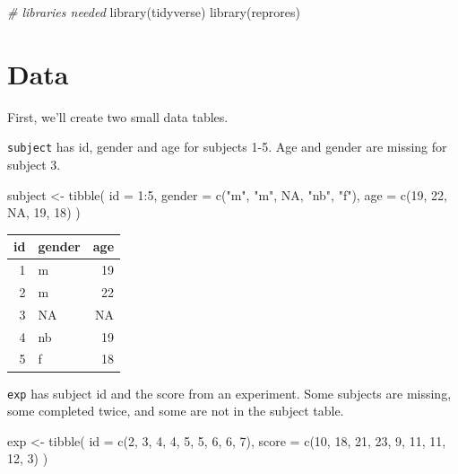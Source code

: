 \documentclass[
  oneside]{book}
\newenvironment{Shaded}{\begin{snugshade}}{\end{snugshade}}
\newcommand{\AttributeTok}[1]{\textcolor[rgb]{0.77,0.63,0.00}{#1}}
\newcommand{\CommentTok}[1]{\textcolor[rgb]{0.56,0.35,0.01}{\textit{#1}}}
\newcommand{\ConstantTok}[1]{\textcolor[rgb]{0.00,0.00,0.00}{#1}}
\newcommand{\DecValTok}[1]{\textcolor[rgb]{0.00,0.00,0.81}{#1}}
\newcommand{\FunctionTok}[1]{\textcolor[rgb]{0.00,0.00,0.00}{#1}}
\newcommand{\NormalTok}[1]{#1}
\newcommand{\OtherTok}[1]{\textcolor[rgb]{0.56,0.35,0.01}{#1}}
\newcommand{\SpecialCharTok}[1]{\textcolor[rgb]{0.00,0.00,0.00}{#1}}
\newcommand{\StringTok}[1]{\textcolor[rgb]{0.31,0.60,0.02}{#1}}
\begin{document}
\begin{Shaded}
\begin{Highlighting}[]
\CommentTok{\# libraries needed}
\FunctionTok{library}\NormalTok{(tidyverse)}
\FunctionTok{library}\NormalTok{(reprores)}
\end{Highlighting}
\end{Shaded}

\hypertarget{data-1}{%
\section{Data}\label{data-1}}

First, we'll create two small data tables.

\texttt{subject} has id, gender and age for subjects 1-5. Age and gender are missing for subject 3.

\begin{Shaded}
\begin{Highlighting}[]
\NormalTok{subject }\OtherTok{\textless{}{-}} \FunctionTok{tibble}\NormalTok{(}
  \AttributeTok{id =} \DecValTok{1}\SpecialCharTok{:}\DecValTok{5}\NormalTok{,}
  \AttributeTok{gender =} \FunctionTok{c}\NormalTok{(}\StringTok{"m"}\NormalTok{, }\StringTok{"m"}\NormalTok{, }\ConstantTok{NA}\NormalTok{, }\StringTok{"nb"}\NormalTok{, }\StringTok{"f"}\NormalTok{),}
  \AttributeTok{age =} \FunctionTok{c}\NormalTok{(}\DecValTok{19}\NormalTok{, }\DecValTok{22}\NormalTok{, }\ConstantTok{NA}\NormalTok{, }\DecValTok{19}\NormalTok{, }\DecValTok{18}\NormalTok{)}
\NormalTok{)}
\end{Highlighting}
\end{Shaded}

\begin{tabular}{r|l|r}
\hline
id & gender & age\\
\hline
1 & m & 19\\
\hline
2 & m & 22\\
\hline
3 & NA & NA\\
\hline
4 & nb & 19\\
\hline
5 & f & 18\\
\hline
\end{tabular}

\texttt{exp} has subject id and the score from an experiment. Some subjects are missing, some completed twice, and some are not in the subject table.

\begin{Shaded}
\begin{Highlighting}[]
\NormalTok{exp }\OtherTok{\textless{}{-}} \FunctionTok{tibble}\NormalTok{(}
  \AttributeTok{id =} \FunctionTok{c}\NormalTok{(}\DecValTok{2}\NormalTok{, }\DecValTok{3}\NormalTok{, }\DecValTok{4}\NormalTok{, }\DecValTok{4}\NormalTok{, }\DecValTok{5}\NormalTok{, }\DecValTok{5}\NormalTok{, }\DecValTok{6}\NormalTok{, }\DecValTok{6}\NormalTok{, }\DecValTok{7}\NormalTok{),}
  \AttributeTok{score =} \FunctionTok{c}\NormalTok{(}\DecValTok{10}\NormalTok{, }\DecValTok{18}\NormalTok{, }\DecValTok{21}\NormalTok{, }\DecValTok{23}\NormalTok{, }\DecValTok{9}\NormalTok{, }\DecValTok{11}\NormalTok{, }\DecValTok{11}\NormalTok{, }\DecValTok{12}\NormalTok{, }\DecValTok{3}\NormalTok{)}
\NormalTok{)}
\end{Highlighting}
\end{Shaded}
\end{document}
